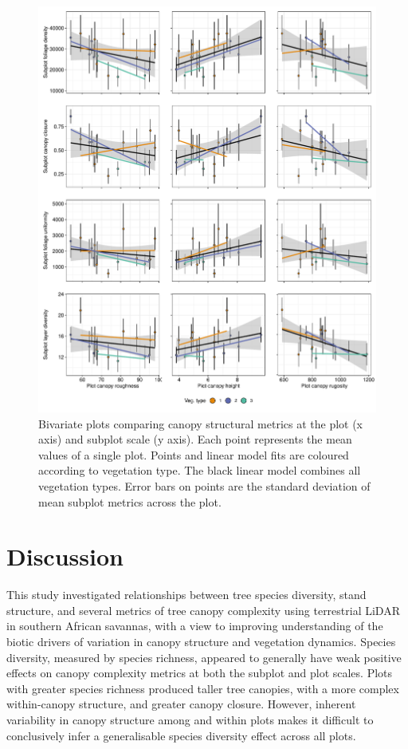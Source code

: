 \documentclass[11pt,a4paper]{article}
\begin{document}
\begin{figure}
	\includegraphics[width=\linewidth]{plot_subplot_bivar}
	\caption{Bivariate plots comparing canopy structural metrics at the plot (x axis) and subplot scale (y axis). Each point represents the mean values of a single plot. Points and linear model fits are coloured according to vegetation type. The black linear model combines all vegetation types. Error bars on points are the standard deviation of mean subplot metrics across the plot.}
	\label{plot_subplot_bivar}
\end{figure}

\section{Discussion}

This study investigated relationships between tree species diversity, stand structure, and several metrics of tree canopy complexity using terrestrial LiDAR in southern African savannas, with a view to improving understanding of the biotic drivers of variation in canopy structure and vegetation dynamics. Species diversity, measured by species richness, appeared to generally have weak positive effects on canopy complexity metrics at both the subplot and plot scales. Plots with greater species richness produced taller tree canopies, with a more complex within-canopy structure, and greater canopy closure. However, inherent variability in canopy structure among and within plots makes it difficult to conclusively infer a generalisable species diversity effect across all plots. 
\end{document}
